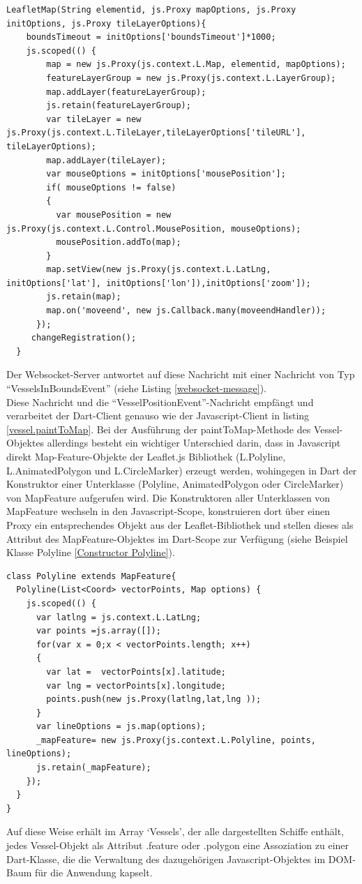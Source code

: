 \begin{lstlisting}[caption=Konstruktor des LeafletMap-Objektes mit Zugriff auf den javascript-Scope, label=LeafletMapConstructor]
LeafletMap(String elementid, js.Proxy mapOptions, js.Proxy initOptions, js.Proxy tileLayerOptions){
    boundsTimeout = initOptions['boundsTimeout']*1000;
    js.scoped(() {
        map = new js.Proxy(js.context.L.Map, elementid, mapOptions);
        featureLayerGroup = new js.Proxy(js.context.L.LayerGroup);
        map.addLayer(featureLayerGroup);
        js.retain(featureLayerGroup);
        var tileLayer = new js.Proxy(js.context.L.TileLayer,tileLayerOptions['tileURL'], tileLayerOptions);
        map.addLayer(tileLayer);
        var mouseOptions = initOptions['mousePosition'];
        if( mouseOptions != false)
        {
          var mousePosition = new js.Proxy(js.context.L.Control.MousePosition, mouseOptions);
          mousePosition.addTo(map);
        }
        map.setView(new js.Proxy(js.context.L.LatLng, initOptions['lat'], initOptions['lon']),initOptions['zoom']);
        js.retain(map);
        map.on('moveend', new js.Callback.many(moveendHandler));
      });
     changeRegistration();
  }
\end{lstlisting}
Der Websocket-Server antwortet auf diese Nachricht mit einer Nachricht von Typ “VesselsInBoundsEvent” (siehe Listing \ref{websocket-message}).\\
Diese Nachricht und die “VesselPositionEvent”-Nachricht empfängt und verarbeitet der Dart-Client genauso wie der Javascript-Client in listing \ref{vessel.paintToMap}. Bei der Ausführung der paintToMap-Methode des Vessel-Objektes allerdings besteht ein wichtiger Unterschied darin, dass in Javascript direkt Map-Feature-Objekte der Leaflet.js Bibliothek (L.Polyline, L.AnimatedPolygon und L.CircleMarker) erzeugt werden, wohingegen in Dart der Konstruktor einer Unterklasse (Polyline, AnimatedPolygon oder CircleMarker) von MapFeature aufgerufen wird. Die Konstruktoren aller Unterklassen von MapFeature wechseln in den Javascript-Scope, konstruieren dort über einen Proxy ein entsprechendes Objekt aus der Leaflet-Bibliothek und stellen dieses als Attribut des MapFeature-Objektes im Dart-Scope zur Verfügung (siehe Beispiel Klasse Polyline \ref{Constructor Polyline}).

\begin{lstlisting}[caption= Constructor des Dart-Objekts Polyline, label = Constructor Polyline]
class Polyline extends MapFeature{
  Polyline(List<Coord> vectorPoints, Map options) {
    js.scoped(() {
      var latlng = js.context.L.LatLng;
      var points =js.array([]);
      for(var x = 0;x < vectorPoints.length; x++)
      {
        var lat =  vectorPoints[x].latitude;
        var lng = vectorPoints[x].longitude;
        points.push(new js.Proxy(latlng,lat,lng ));
      }
      var lineOptions = js.map(options);
      _mapFeature= new js.Proxy(js.context.L.Polyline, points, lineOptions);
      js.retain(_mapFeature);
    });
  }
}
\end{lstlisting}
Auf diese Weise erhält im Array ‘Vessels’, der alle dargestellten Schiffe enthält, jedes Vessel-Objekt als Attribut .feature oder .polygon eine Assoziation zu einer Dart-Klasse, die die Verwaltung des dazugehörigen Javascript-Objektes im DOM-Baum für die Anwendung kapselt.


